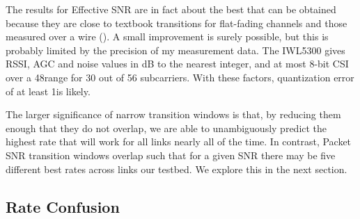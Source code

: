 The results for Effective SNR are in fact about the best that can be obtained because they are close to textbook transitions for flat-fading channels and those measured over a wire (). A small improvement is surely possible, but this is probably limited by the precision of my measurement data. The IWL5300 gives RSSI, AGC and noise values in dB to the nearest integer, and at most 8-bit CSI over a 48\dB range for 30 out of 56 subcarriers. With these factors, quantization error of at least 1\dB is likely.

The larger significance of narrow transition windows is that, by reducing them enough that they do not overlap, we are able to
unambiguously predict the highest rate that will work for all links nearly all of the time. In contrast, Packet SNR transition windows overlap such that for a given SNR there may be five different best rates across links our testbed. We explore this in the next section.


\subsection{Rate Confusion}


